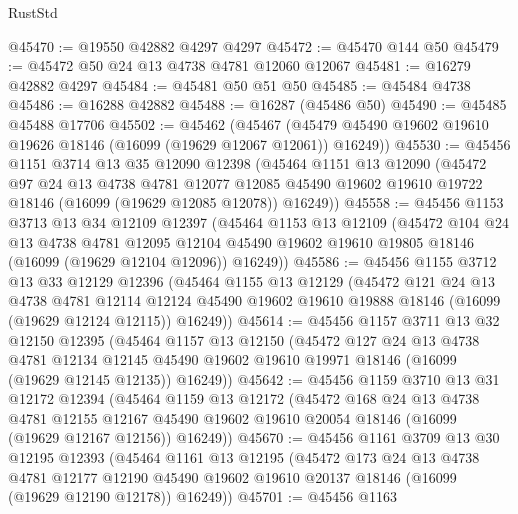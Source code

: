 \begin{lexlean}{RustStd}
\begin{coremodule}
@45470 := @19550 @42882 @4297 @4297
@45472 := @45470 @144 @50
@45479 := @45472 @50 @24 @13 @4738 @4781 @12060 @12067
@45481 := @16279 @42882 @4297
@45484 := @45481 @50 @51 @50
@45485 := @45484 @4738
@45486 := @16288 @42882
@45488 := @16287 (@45486 @50)
@45490 := @45485 @45488 @17706
@45502 := @45462
    (@45467 (@45479 @45490 @19602 @19610 @19626 @18146 (@16099 (@19629 @12067 @12061)) @16249))
@45530 := @45456
    @1151
    @3714
    @13
    @35
    @12090
    @12398
    (@45464
      @1151
      @13
      @12090
      (@45472
        @97
        @24
        @13
        @4738
        @4781
        @12077
        @12085
        @45490
        @19602
        @19610
        @19722
        @18146
        (@16099 (@19629 @12085 @12078))
        @16249))
@45558 := @45456
    @1153
    @3713
    @13
    @34
    @12109
    @12397
    (@45464
      @1153
      @13
      @12109
      (@45472
        @104
        @24
        @13
        @4738
        @4781
        @12095
        @12104
        @45490
        @19602
        @19610
        @19805
        @18146
        (@16099 (@19629 @12104 @12096))
        @16249))
@45586 := @45456
    @1155
    @3712
    @13
    @33
    @12129
    @12396
    (@45464
      @1155
      @13
      @12129
      (@45472
        @121
        @24
        @13
        @4738
        @4781
        @12114
        @12124
        @45490
        @19602
        @19610
        @19888
        @18146
        (@16099 (@19629 @12124 @12115))
        @16249))
@45614 := @45456
    @1157
    @3711
    @13
    @32
    @12150
    @12395
    (@45464
      @1157
      @13
      @12150
      (@45472
        @127
        @24
        @13
        @4738
        @4781
        @12134
        @12145
        @45490
        @19602
        @19610
        @19971
        @18146
        (@16099 (@19629 @12145 @12135))
        @16249))
@45642 := @45456
    @1159
    @3710
    @13
    @31
    @12172
    @12394
    (@45464
      @1159
      @13
      @12172
      (@45472
        @168
        @24
        @13
        @4738
        @4781
        @12155
        @12167
        @45490
        @19602
        @19610
        @20054
        @18146
        (@16099 (@19629 @12167 @12156))
        @16249))
@45670 := @45456
    @1161
    @3709
    @13
    @30
    @12195
    @12393
    (@45464
      @1161
      @13
      @12195
      (@45472
        @173
        @24
        @13
        @4738
        @4781
        @12177
        @12190
        @45490
        @19602
        @19610
        @20137
        @18146
        (@16099 (@19629 @12190 @12178))
        @16249))
@45701 := @45456
    @1163

\end{coremodule}
\end{lexlean}
